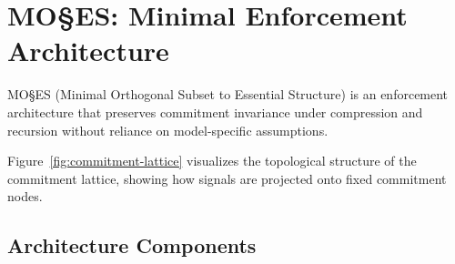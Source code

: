 \documentclass[11pt,a4paper]{article}
\begin{document}
\section{MO\S{}ES\texttrademark{}: Minimal Enforcement Architecture}
\label{sec:moses}

MO\S{}ES\texttrademark{} (Minimal Orthogonal Subset to Essential Structure) is an enforcement architecture that preserves commitment invariance under compression and recursion without reliance on model-specific assumptions.

Figure~\ref{fig:commitment-lattice} visualizes the topological structure of the commitment lattice, showing how signals are projected onto fixed commitment nodes.



\subsection{Architecture Components}
\end{document}
